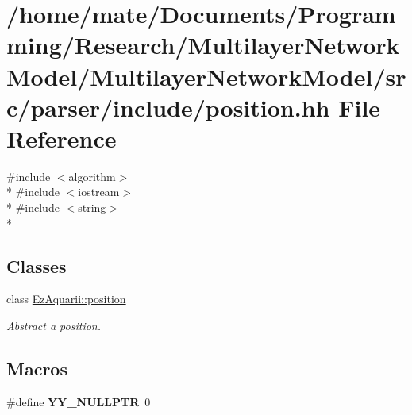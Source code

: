 \hypertarget{position_8hh}{}\section{/home/mate/\+Documents/\+Programming/\+Research/\+Multilayer\+Network\+Model/\+Multilayer\+Network\+Model/src/parser/include/position.hh File Reference}
\label{position_8hh}
{\ttfamily \#include $<$algorithm$>$}\\*
{\ttfamily \#include $<$iostream$>$}\\*
{\ttfamily \#include $<$string$>$}\\*
\subsection*{Classes}
\begin{DoxyCompactItemize}
\item 
class \hyperlink{classEzAquarii_1_1position}{Ez\+Aquarii\+::position}
\begin{DoxyCompactList}\small\item\em Abstract a position. \end{DoxyCompactList}\end{DoxyCompactItemize}
\subsection*{Macros}
\begin{DoxyCompactItemize}
\item 
\#define {\bfseries Y\+Y\+\_\+\+N\+U\+L\+L\+P\+TR}~0\hypertarget{position_8hh_a5a6c82f7ce4ad9cc8c6c08b7a2de5b84}{}\label{position_8hh_a5a6c82f7ce4ad9cc8c6c08b7a2de5b84}

\end{DoxyCompactItemize}
